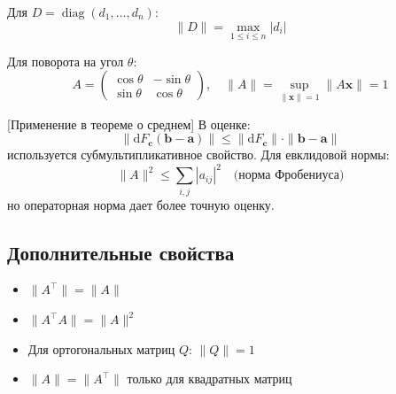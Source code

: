 \begin{example}
Для \(D = \operatorname{diag}(d_1,\dots,d_n)\):
\[
\|D\| = \max_{1 \leq i \leq n} |d_i|
\]
\end{example}

\begin{example}
Для поворота на угол \(\theta\):
\[
A = \begin{pmatrix} \cos\theta & -\sin\theta \\ \sin\theta & \cos\theta \end{pmatrix}, \quad 
\|A\| = \sup_{\|\mathbf{x}\|=1} \|A\mathbf{x}\| = 1
\]
\end{example}

[Применение в теореме о среднем]
В оценке:
\[
\|\mathrm{d}F_{\mathbf{c}}(\mathbf{b}-\mathbf{a})\| \leqslant \|\mathrm{d}F_{\mathbf{c}}\| \cdot \|\mathbf{b}-\mathbf{a}\|
\]
используется субмультипликативное свойство. Для евклидовой нормы:
\[
\|A\|^2 \leqslant \sum_{i,j} |a_{ij}|^2 \quad \text{(норма Фробениуса)}
\]
но операторная норма дает более точную оценку.


\subsection*{Дополнительные свойства}
\begin{itemize}
\item \(\|A^\top\| = \|A\|\)
\item \(\|A^\top A\| = \|A\|^2\)
\item Для ортогональных матриц \(Q\): \(\|Q\| = 1\)
\item \(\|A\| = \|A^\top\|\) только для квадратных матриц
\end{itemize}

